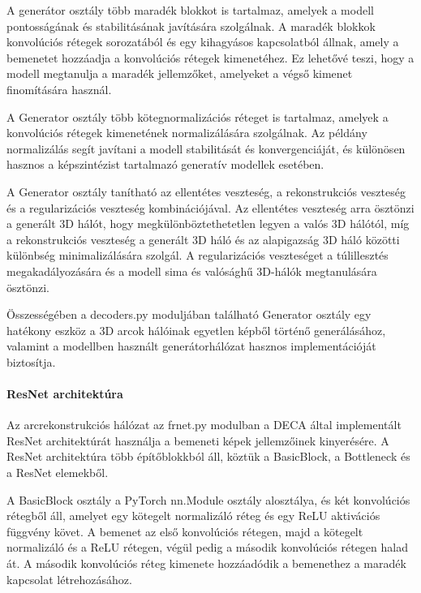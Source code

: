 \documentclass[12pt,a4]{article}
\begin{document}
             A generátor osztály több maradék blokkot is tartalmaz, amelyek a modell pontosságának és stabilitásának javítására szolgálnak. 
             A maradék blokkok konvolúciós rétegek sorozatából és egy kihagyásos kapcsolatból állnak, amely a bemenetet hozzáadja a konvolúciós rétegek kimenetéhez.
             Ez lehetővé teszi, hogy a modell megtanulja a maradék jellemzőket, amelyeket a végső kimenet finomítására használ.
             
             A Generator osztály több kötegnormalizációs réteget is tartalmaz, amelyek a konvolúciós rétegek kimenetének normalizálására szolgálnak.
             Az példány normalizálás segít javítani a modell stabilitását és konvergenciáját, és különösen hasznos a képszintézist tartalmazó generatív modellek esetében.
             
             A Generator osztály tanítható az ellentétes veszteség, a rekonstrukciós veszteség és a regularizációs veszteség kombinációjával.
             Az ellentétes veszteség arra ösztönzi a generált 3D hálót, hogy megkülönböztethetetlen legyen a valós 3D hálótól, míg a rekonstrukciós veszteség a generált 3D háló és az alapigazság 3D háló közötti különbség minimalizálására szolgál. 
             A regularizációs veszteséget a túlillesztés megakadályozására és a modell sima és valósághű 3D-hálók megtanulására ösztönzi.
             
             Összességében a decoders.py moduljában található Generator osztály egy hatékony eszköz a 3D arcok hálóinak egyetlen képből történő generálásához,
             valamint a modellben használt generátorhálózat hasznos implementációját biztosítja.
                     
         \paragraph{ResNet architektúra}

            Az arcrekonstrukciós hálózat az frnet.py modulban a DECA \cite{deca} által implementált ResNet architektúrát használja a bemeneti képek jellemzőinek kinyerésére. 
            A ResNet architektúra több építőblokkból áll, köztük a BasicBlock, a Bottleneck és a ResNet elemekből.
            
            A BasicBlock osztály a PyTorch nn.Module osztály alosztálya, és két konvolúciós rétegből áll, amelyet egy kötegelt normalizáló réteg és egy ReLU aktivációs függvény követ.
            A bemenet az első konvolúciós rétegen, majd a kötegelt normalizáló és a ReLU rétegen, végül pedig a második konvolúciós rétegen halad át. 
            A második konvolúciós réteg kimenete hozzáadódik a bemenethez a maradék kapcsolat létrehozásához.
            
\end{document}
